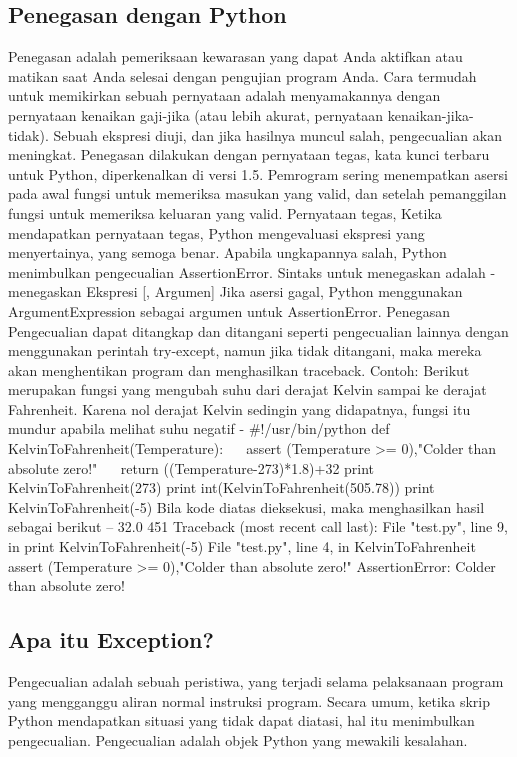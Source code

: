\subsection{Penegasan dengan Python}
Penegasan adalah pemeriksaan kewarasan yang dapat Anda aktifkan atau matikan saat Anda selesai dengan pengujian program Anda.
Cara termudah untuk memikirkan sebuah pernyataan adalah menyamakannya dengan pernyataan kenaikan gaji-jika (atau lebih akurat, pernyataan kenaikan-jika-tidak). Sebuah ekspresi diuji, dan jika hasilnya muncul salah, pengecualian akan meningkat.
Penegasan dilakukan dengan pernyataan tegas, kata kunci terbaru untuk Python, diperkenalkan di versi 1.5.
Pemrogram sering menempatkan asersi pada awal fungsi untuk memeriksa masukan yang valid, dan setelah pemanggilan fungsi untuk memeriksa keluaran yang valid.
Pernyataan tegas, Ketika mendapatkan pernyataan tegas, Python mengevaluasi ekspresi yang menyertainya, yang semoga benar. Apabila ungkapannya salah, Python menimbulkan pengecualian AssertionError.
Sintaks untuk menegaskan adalah - menegaskan Ekspresi [, Argumen] 
Jika asersi gagal, Python menggunakan ArgumentExpression sebagai argumen untuk AssertionError. Penegasan Pengecualian dapat ditangkap dan ditangani seperti pengecualian lainnya dengan menggunakan perintah try-except, namun jika tidak ditangani, maka mereka akan menghentikan program dan menghasilkan traceback.
Contoh: 
Berikut merupakan fungsi yang mengubah suhu dari derajat Kelvin sampai ke derajat Fahrenheit. Karena nol derajat Kelvin sedingin yang didapatnya, fungsi itu mundur apabila melihat suhu negatif -
 $  \#  $!/usr/bin/python
def KelvinToFahrenheit(Temperature): 
~~ assert (Temperature >= 0),"Colder than absolute zero!" 
~~ return ((Temperature-273)*1.8)+32 
print KelvinToFahrenheit(273) 
print int(KelvinToFahrenheit(505.78)) 
print KelvinToFahrenheit(-5) 
\vspace{12pt}
Bila kode diatas dieksekusi, maka menghasilkan hasil sebagai berikut – 
32.0 
451 
Traceback (most recent call last): 
File "test.py", line 9, in  
print KelvinToFahrenheit(-5) 
File "test.py", line 4, in KelvinToFahrenheit 
assert (Temperature >= 0),"Colder than absolute zero!" 
AssertionError: Colder than absolute zero! 

\subsection{Apa itu Exception?}
Pengecualian adalah sebuah peristiwa, yang terjadi selama pelaksanaan program yang mengganggu aliran normal instruksi program. Secara umum, ketika skrip Python mendapatkan situasi yang tidak dapat diatasi, hal itu menimbulkan pengecualian. Pengecualian adalah objek Python yang mewakili kesalahan.



